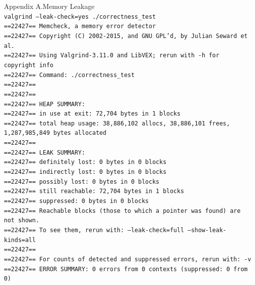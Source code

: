 \documentclass{beamer}
\begin{document}
\begin{frame}{Appendix A.}{Memory Leakage}
  \texttt{\tiny{\\
    valgrind --leak-check=yes ./correctness\_test\\
    ==22427== Memcheck, a memory error detector \\
    ==22427== Copyright (C) 2002-2015, and GNU GPL'd, by Julian Seward et al.\\
    ==22427== Using Valgrind-3.11.0 and LibVEX; rerun with -h for copyright info\\
    ==22427== Command: ./correctness\_test\\
    ==22427== \\
    ==22427== \\
    ==22427== HEAP SUMMARY:\\
    ==22427==     in use at exit: 72,704 bytes in 1 blocks\\
    ==22427==   total heap usage: 38,886,102 allocs, 38,886,101 frees, 1,287,985,849 bytes allocated\\
    ==22427== \\
    ==22427== LEAK SUMMARY:\\
    ==22427==    definitely lost: 0 bytes in 0 blocks\\
    ==22427==    indirectly lost: 0 bytes in 0 blocks\\
    ==22427==      possibly lost: 0 bytes in 0 blocks\\
    ==22427==    still reachable: 72,704 bytes in 1 blocks\\
    ==22427==         suppressed: 0 bytes in 0 blocks\\
    ==22427== Reachable blocks (those to which a pointer was found) are not shown.\\
    ==22427== To see them, rerun with: --leak-check=full --show-leak-kinds=all\\
    ==22427== \\
    ==22427== For counts of detected and suppressed errors, rerun with: -v\\
    ==22427== ERROR SUMMARY: 0 errors from 0 contexts (suppressed: 0 from 0)\\
  }}

\end{frame}
\end{document}
